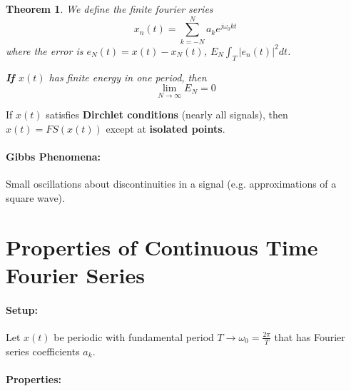 \documentclass[a4paper,12pt]{report}
\newtheorem{theorem}{Theorem}
\begin{document}
\begin{theorem}
We define the finite fourier series 
\begin{equation}
x_n(t) = \sum_{k=-N}^{N} a_k e^{j\omega_0 kt}
\end{equation}
where the error is $e_N(t) = x(t) - x_N(t)$, $E_N \int_{T}^{} |e_n(t)|^2 dt$. 

\textbf{If $x(t)$} has finite energy in one period, then 
\begin{equation}
\lim_{N\to \infty} E_N = 0
\end{equation}

\end{theorem}

If $x(t)$ satisfies \textbf{Dirchlet conditions} (nearly all signals), then $x(t) = FS(x(t))$ except at \textbf{isolated points}.

\paragraph{Gibbs Phenomena: } Small oscillations about discontinuities in a signal (e.g. approximations of a square wave).

\section{Properties of Continuous Time Fourier Series}

\paragraph{Setup: } Let $x(t)$ be periodic with fundamental period $T\to \omega_0 = \frac{2\pi}{T}$ that has Fourier series coefficients $a_k$.

\paragraph{Properties: } 
\end{document}
